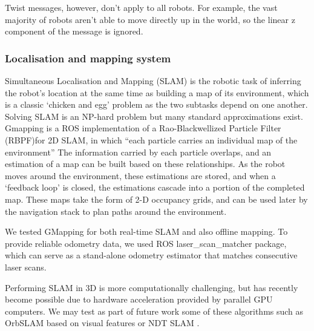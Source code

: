 \documentclass[a4paper]{article}
\begin{document}
Twist messages, however, don’t apply to all robots. For example, the vast majority of robots
aren’t able to move directly up in the world, so the linear z component of the message is
ignored. 

\subsubsection{Localisation and mapping system}

Simultaneous Localisation and Mapping (SLAM) \cite{thrun2002probabilistic} is the robotic task of inferring the robot’s location at the same time as building a map of its environment, which is a classic `chicken and egg’ problem as the two subtasks depend on one another. Solving SLAM is an NP-hard problem but many standard approximations exist. Gmapping \cite{yuen2017improved} is a ROS implementation of a Rao-Blackwellized Particle Filter (RBPF)for 2D SLAM, in which “each particle carries an individual map of the environment”  The information carried by each particle overlaps, and an estimation of a map can be built based on these relationships. As the robot moves around the environment, these estimations are stored, and when a ‘feedback loop’ is closed, the estimations cascade into a portion of the completed map. These maps take the form of 2-D occupancy grids, and can be used later by the navigation stack to plan paths around the environment.

We tested GMapping for both real-time SLAM and also offline mapping. To provide reliable odometry data, we used ROS laser\_scan\_matcher package, which can serve as a stand-alone odometry estimator that matches consecutive laser scans.

Performing SLAM in 3D is more computationally challenging, but has recently become possible due to hardware acceleration provided by parallel GPU computers. We may test as part of future work some of these algorithms such as OrbSLAM based on visual features or NDT SLAM \cite{einhorn2015generic}. 
\end{document}
